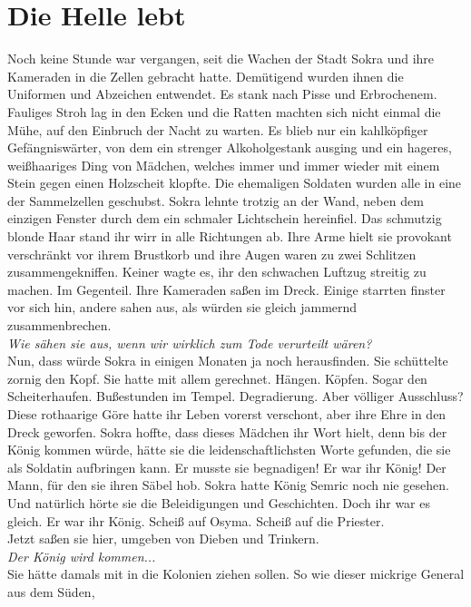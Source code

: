 \chapter{Die Helle lebt}

Noch keine Stunde war vergangen, seit die Wachen der Stadt Sokra und ihre Kameraden in die Zellen 
gebracht hatte. Demütigend wurden ihnen die Uniformen und Abzeichen entwendet. Es stank nach Pisse 
und Erbrochenem. Fauliges Stroh lag in den Ecken und die Ratten machten sich nicht einmal die Mühe, 
auf den Einbruch der Nacht zu warten. Es blieb nur ein kahlköpfiger Gefängniswärter, von dem ein 
strenger Alkoholgestank ausging und ein hageres, weißhaariges Ding von Mädchen, welches immer und 
immer wieder mit einem Stein gegen einen Holzscheit klopfte. Die ehemaligen Soldaten wurden alle in 
eine der Sammelzellen geschubst. Sokra lehnte trotzig an der Wand, neben dem einzigen Fenster durch 
dem ein schmaler Lichtschein hereinfiel. Das schmutzig blonde Haar stand ihr wirr in alle Richtungen 
ab. Ihre Arme hielt sie provokant verschränkt vor ihrem Brustkorb und ihre Augen waren zu zwei 
Schlitzen zusammengekniffen. Keiner wagte es, ihr den schwachen Luftzug streitig zu machen. Im 
Gegenteil. Ihre Kameraden saßen im Dreck. Einige starrten finster vor sich hin, andere sahen aus, 
als würden sie gleich jammernd zusammenbrechen.\\
\textit{Wie sähen sie aus, wenn wir wirklich zum Tode verurteilt wären?}\\
Nun, dass würde Sokra in einigen Monaten ja noch herausfinden. Sie schüttelte zornig den Kopf. Sie 
hatte mit allem gerechnet. Hängen. Köpfen. Sogar den Scheiterhaufen. Bußestunden im Tempel. 
Degradierung. Aber völliger Ausschluss? Diese rothaarige Göre hatte ihr Leben vorerst verschont, 
aber ihre Ehre in den Dreck geworfen. Sokra hoffte, dass dieses Mädchen ihr Wort hielt, denn bis 
der König kommen würde, hätte sie die leidenschaftlichsten Worte gefunden, die sie als Soldatin 
aufbringen kann. Er musste sie begnadigen! Er war ihr König! Der Mann, für den sie ihren Säbel 
hob. Sokra hatte König Semric noch nie gesehen. Und natürlich hörte sie die Beleidigungen und 
Geschichten. Doch ihr war es gleich. Er war ihr König. Scheiß auf Osyma. Scheiß auf die Priester.\\
Jetzt saßen sie hier, umgeben von Dieben und Trinkern.\\
\textit{Der König wird kommen...}\\
Sie hätte damals mit in die Kolonien ziehen sollen. So wie dieser mickrige General aus dem Süden, 

